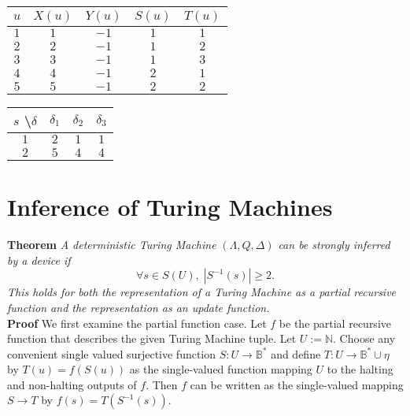 \documentclass[11pt]{article}
\newcommand{\N}{\mathbb{N}}
\newcommand{\B}{\mathbb{B}}
\begin{document}
 \begin{center}
 \begin{tabular}{ |c||c|c|c|c| } 

 \hline
 $ u $ & $ X(u) $ & $ Y(u) $ & $ S(u) $ & $ T(u) $ \\ 
 \hline
 \hline
 $ 1 $ & $ 1 $ & $ -1 $ & $ 1 $ & $ 1 $ \\
 \hline
 $ 2 $ & $ 2 $ & $ -1 $ & $ 1 $ & $ 2 $ \\
 \hline
 $ 3 $ & $ 3 $ & $ -1 $ & $ 1 $ & $ 3 $ \\
 \hline
 $ 4 $ & $ 4 $ & $ -1 $ & $ 2 $ & $ 1 $ \\
 \hline
 $ 5 $ & $ 5 $ & $ -1 $ & $ 2 $ & $ 2 $ \\
 \hline
 \end{tabular} 
 \quad
 \begin{tabular}{ |c||c|c|c| } 

 \hline
 $ s $ \textbackslash $ \delta $ & $ \delta_1 $ & $ \delta_2 $ & $ \delta_3 $ \\ 
 \hline
 \hline
 $ 1 $ & $ 2 $ & $ 1 $ & $ 1 $  \\
  \hline
 $ 2 $ & $ 5 $ & $ 4 $ & $ 4 $  \\
 \hline
 
 \end{tabular}
 \end{center} 

\bigskip 
\bigskip
\section{Inference of Turing Machines}
\textbf{Theorem} \quad \textit{A deterministic Turing Machine} $(\Lambda, Q, \Delta)$ \textit{can be strongly inferred by a device if} 
$$\forall s \in S(U),\; |S^{-1}(s)| \geq 2. $$ \textit{This holds for both the representation of a Turing Machine as a partial recursive function and the representation as an update function.} \\

\textbf{Proof} \quad We first examine the partial function case. Let $ f $ be the partial recursive function that describes the given Turing Machine tuple. Let $ U := \N $. Choose any convenient single valued surjective function $ S: U \rightarrow \B^{*} $ and define $ T: U \rightarrow \B^{*} \cup \eta$ by $T(u) = f(S(u)) $ as the single-valued function mapping $ U $ to the halting and non-halting outputs of $ f $. Then $ f $ can be written as the single-valued mapping $ S \rightarrow T $ by $ f(s) = T(S^{-1}(s)) $. \\
\end{document}
